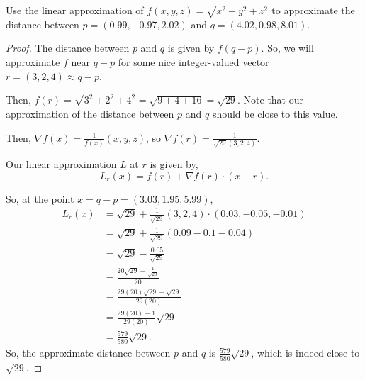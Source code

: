 \documentclass[../hw4]{subfiles}
\begin{document}
\begin{problem}[4]
Use the linear approximation of $f(x,y,z)=\sqrt{x^2 + y^2 + z^2}$ to approximate the distance between $p=(0.99,-0.97,2.02)$ and  $q=(4.02,0.98,8.01)$.
\end{problem}
\begin{proof}
	The distance between $p$ and  $q$ is given by  $f(q-p)$. So, we will approximate  $f$ near  $q-p$ for some nice integer-valued vector  $r=(3,2,4)\approx q-p$.

	Then, $f(r)=\sqrt{3^2+2^2+4^2}=\sqrt{9 + 4 + 16} = \sqrt{29}$. Note that our approximation of the distance between $p$ and  $q$ should be close to this value.

	Then,  $\nabla f (x) = \frac{1}{f(x)}(x,y,z)$, so $\nabla f(r) = \frac{1}{\sqrt{29}(3,2,4) }$.

	Our linear approximation $L$ at  $r$ is given by,  \[
		L_r(x)=f(r)+\nabla f(r)\cdot (x-r)
		.\]

	So, at the point $x=q-p=(3.03,1.95,5.99)$, \begin{align*}
		L_r(x) & =\sqrt{29}+\frac{1}{\sqrt{29} }(3,2,4)\cdot (0.03,-0.05,-0.01) \\
		       & = \sqrt{29}+\frac{1}{\sqrt{29}} (0.09-0.1-0.04)                \\
		       & = \sqrt{29}-\frac{0.05}{\sqrt{29} }                            \\
		       & = \frac{20\sqrt{29} - \frac{1}{\sqrt{29} } }{20}               \\
		       & = \frac{29(20)\sqrt{29} -\sqrt{29} }{29(20)}                   \\
		       & = \frac{29(20)-1}{29(20)}\sqrt{29}                             \\
		       & = \frac{579}{580}\sqrt{29}
		.\end{align*}
	So, the approximate distance between $p$ and  $q$ is  $\frac{579}{580}\sqrt{29}$, which is indeed close to $\sqrt{29}$.
\end{proof}
\end{document}
